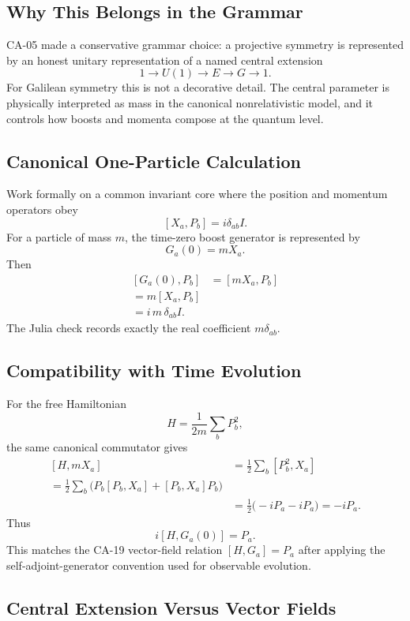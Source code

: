 \subsection{Why This Belongs in the Grammar}

CA-05 made a conservative grammar choice: a projective symmetry is represented
by an honest unitary representation of a named central extension
\[
  1\longrightarrow U(1)\longrightarrow E\longrightarrow G\longrightarrow 1.
\]
For Galilean symmetry this is not a decorative detail.  The central parameter is
physically interpreted as mass in the canonical nonrelativistic model, and it
controls how boosts and momenta compose at the quantum level.

\subsection{Canonical One-Particle Calculation}

Work formally on a common invariant core where the position and momentum
operators obey
\[
  [X_a,P_b]=i\delta_{ab}I.
\]
For a particle of mass \(m\), the time-zero boost generator is represented by
\[
  G_a(0)=mX_a.
\]
Then
\[
\begin{aligned}
  [G_a(0),P_b]
    &= [mX_a,P_b]\\
    = m[X_a,P_b]\\
    = i\,m\,\delta_{ab}I.
\end{aligned}
\]
The Julia check records exactly the real coefficient \(m\delta_{ab}\).

\subsection{Compatibility with Time Evolution}

For the free Hamiltonian
\[
  H=\frac{1}{2m}\sum_b P_b^2,
\]
the same canonical commutator gives
\[
\begin{aligned}
  [H,mX_a]
  &= \frac{1}{2}\sum_b [P_b^2,X_a]\\
  = \frac{1}{2}\sum_b\bigl(P_b[P_b,X_a]+[P_b,X_a]P_b\bigr)\\
  &= \frac{1}{2}\bigl(-iP_a-iP_a\bigr)
  = -iP_a.
\end{aligned}
\]
Thus
\[
  i[H,G_a(0)]=P_a.
\]
This matches the CA-19 vector-field relation \([H,G_a]=P_a\) after applying the
self-adjoint-generator convention used for observable evolution.

\subsection{Central Extension Versus Vector Fields}

